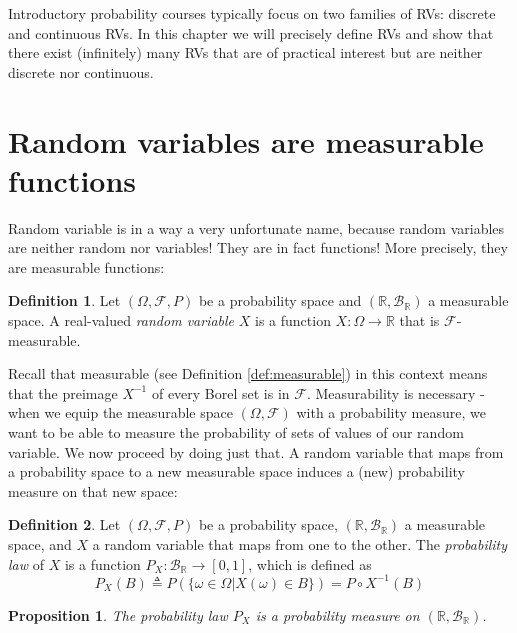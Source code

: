 \documentclass{book}
\theoremstyle{plain}%
\newtheorem{proposition}{Proposition}[section]
\theoremstyle{definition}
\newtheorem{definition}{Definition}[section]
\newlength{\arrow}
\begin{document}
Introductory probability courses typically focus on two families of RVs: discrete and continuous RVs. In this chapter we will precisely define RVs and show that there exist (infinitely) many RVs that are of practical interest but are neither discrete nor continuous.

\section{Random variables are measurable functions}

Random variable is in a way a very unfortunate name, because random variables are neither random nor variables! They are in fact functions! More precisely, they are measurable functions:

\begin{definition}
Let $(\Omega, \mathcal{F}, P)$ be a probability space and $(\mathbb{R}, \mathcal{B}_\mathbb{R})$ a measurable space. A real-valued \emph{random variable} $X$ is a function $X: \Omega \rightarrow \mathbb{R}$ that is $\mathcal{F}$-measurable. 
\end{definition}

Recall that measurable (see Definition \ref{def:measurable}) in this context means that the preimage $X^{-1}$ of every Borel set is in $\mathcal{F}$. Measurability is necessary - when we equip the measurable space $(\Omega, \mathcal{F})$ with a probability measure, we want to be able to measure the probability of sets of values of our random variable. We now proceed by doing just that. A random variable that maps from a probability space to a new measurable space induces a (new) probability measure on that new space:

\begin{definition}
Let $(\Omega, \mathcal{F}, P)$ be a probability space, $(\mathbb{R}, \mathcal{B}_\mathbb{R})$ a measurable space, and $X$ a random variable that maps from one to the other. The \emph{probability law} of $X$ is a function $P_X: \mathcal{B}_\mathbb{R} \rightarrow [0,1]$, which is defined as $$P_X(B) \triangleq P(\{\omega \in \Omega | X(\omega) \in B\}) = P \circ X^{-1}(B)$$
\end{definition}

\begin{proposition}
The probability law $P_X$ is a probability measure on $(\mathbb{R},\mathcal{B}_\mathbb{R})$.
\end{proposition}
\end{document}
